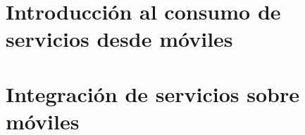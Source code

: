 \section{Introducción al consumo de servicios desde móviles}

\section{Integración de servicios sobre móviles}
